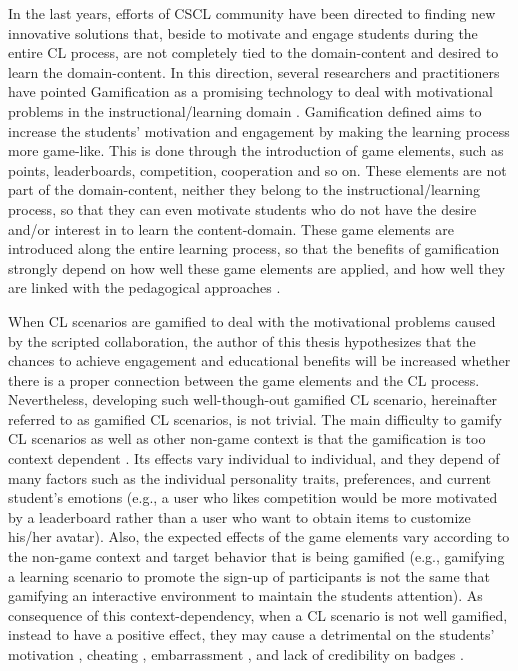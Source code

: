 In the last years, efforts of CSCL community have been directed to finding new innovative solutions that, beside to motivate and engage students during the entire CL process, are not completely tied to the domain-content and desired to learn the domain-content.
In this direction, several researchers and practitioners have pointed Gamification as a promising technology to deal with motivational problems in the instructional/learning domain \cite{ChallcoMoreiraMizoguchiIsotani2014, SeabornFels2015, BorgesDurelliReisIsotani2014}.
Gamification defined  \cite{DeterdingDixonKhaledNacke2011} aims to increase the students' motivation and engagement by making the learning process more game-like. This is done through the introduction of game elements, such as points, leaderboards, competition, cooperation and so on. These elements are not part of the domain-content, neither they belong to the instructional/learning process, so that they can even motivate students who do not have the desire and/or interest in to learn the content-domain. These game elements are introduced along the entire learning process, so that the benefits of gamification strongly depend on how well these game elements are applied, and how well they are linked with the pedagogical approaches \cite{Kapp2012, KnutasIkonenNikulaPorras2014}.

When CL scenarios are gamified to deal with the motivational problems caused by the scripted collaboration, the author of this thesis hypothesizes that the chances to achieve engagement and educational benefits will be increased whether there is a proper connection between the game elements and the CL process. Nevertheless, developing such well-though-out gamified CL scenario, hereinafter referred to as gamified CL scenarios, is not trivial. The main difficulty to gamify CL scenarios as well as other non-game context is that the gamification is too context dependent \cite{HamariKoivistoSarsa2014, RichardsThompsonGraham2014}. Its effects vary individual to individual, and they depend of many factors such as the individual personality traits, preferences, and current student's emotions \cite{Nicholson2015, PedroLopesPratesVassilevaIsotani2015} (e.g., a user who likes competition would be more motivated by a leaderboard rather than a user who want to obtain items to customize his/her avatar). Also, the expected effects of the game elements vary according to the non-game context and target behavior that is being gamified \cite{DeterdingBjorkNackeDixonLawley2013, HeeterLeeMedlerMagerko2011} (e.g., gamifying a learning scenario to promote the sign-up of participants is not the same that gamifying an interactive environment to maintain the students attention). As consequence of this context-dependency, when a CL scenario is not well gamified, instead to have a positive effect, they may cause a detrimental on the students’ motivation \cite{AndradeMizoguchiIsotani2016}, cheating \cite{NunesBittencourtIsotaniJaques2016}, embarrassment \cite{OhnoYamasakiTokiwa2013}, and lack of credibility on badges \cite{DavisSingh2015}.

